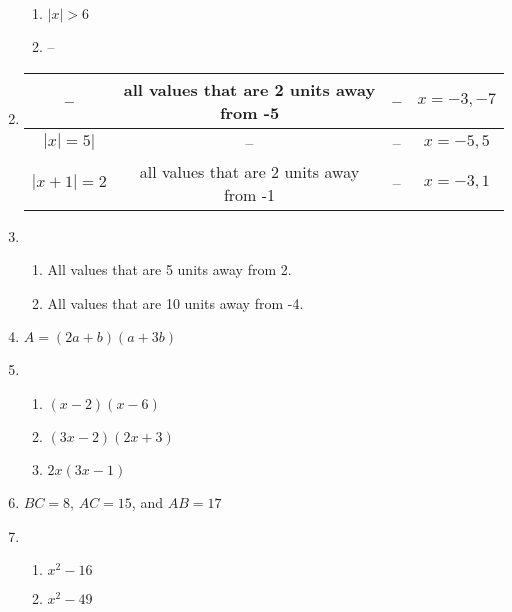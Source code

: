 \documentclass{article}
\begin{document}
\begin{enumerate}
\begin{enumerate}
	\item $|x| > 6$
	
	\item --
	
	\end{enumerate}
	
\item
	\begin{tabular}{| c | c | c | c |}
	\hline
	 -- & all values that are 2 units away from -5 & -- & $x = -3, -7$ \\
	\hline
	$|x| =5|$ & -- & -- & $x = -5, 5$ \\
	\hline
	$|x + 1| = 2$ & all values that are 2 units away from -1 & -- & $x = -3, 1$ \\
	\hline
	\end{tabular}
	
\item 

	\begin{enumerate}
	
	\item All values that are 5 units away from 2.

	\item All values that are 10 units away from -4.

	\end{enumerate}
	
\item $A = (2a + b)(a + 3b)$

\item

	\begin{enumerate}
	
	\item $(x - 2)(x - 6)$
	
	\item $(3x - 2)(2x + 3)$
	
	\item $2x(3x -1)$
	
	\end{enumerate}
	
\item $BC = 8$, $AC = 15$, and $AB = 17$

\item

	\begin{enumerate}
	
	\item $x^2 - 16$
	
	\item $x^2 - 49$
	

\end{enumerate}
\end{enumerate}
\end{document}
